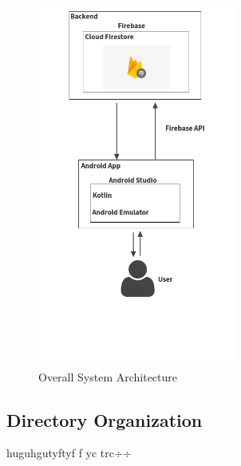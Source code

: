 \documentclass[conference]{IEEEtran}
\numberwithin{figure}{subsection}
\begin{document}
\begin{figure}[h]
    \centering
    \hfill
    \includegraphics[width=6.5cm]
    {bibtex/images/Overall Architecture.png}
    \hfill
    \caption{Overall System Architecture}
\end{figure}



\clearpage
\subsection{Directory Organization}
huguhgutyftyf f yc trc÷÷
\\ \hspace*{\fill} \\
\end{document}

